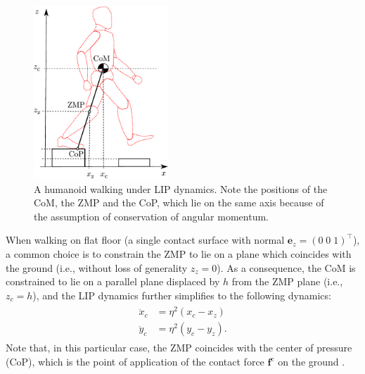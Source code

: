 \begin{figure}
    \centering
    \includegraphics[width=0.45\textwidth]{figures/LIPM_robot.pdf}
    \caption{A humanoid walking under LIP dynamics. Note the positions of the CoM, the ZMP and the CoP, which lie on the same axis because of the assumption of conservation of angular momentum.}
    \label{fig:LIPM-robot}
\end{figure}

When walking on flat floor (a single contact surface with normal
$\bm{e}_z=(0 \; 0\; 1)^\top$),
a common choice is to constrain the ZMP to lie on
a plane which coincides with the ground (i.e., without loss of generality
$z_z=0$). As a consequence, the CoM is constrained to lie on a parallel plane
displaced by $h$ from the ZMP plane (i.e., $z_c=h$), and
the LIP dynamics further simplifies to the following dynamics:
\begin{align}
    \label{eq:LIPM-xy}
    \begin{split}
        \ddot{x}_c &= \eta^2 (x_c - x_z) \\
        \ddot{y}_c &= \eta^2 (y_c - y_z).
    \end{split}
\end{align}
Note that, in this particular case, the ZMP coincides with the center of
pressure (CoP), which is the point of application of the contact force
$\bm{f}^{\mathrm{c}}$ on the ground \cite{SardainBessonnet2004}.

